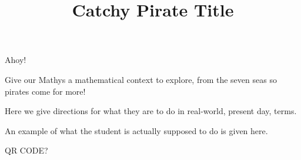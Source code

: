 \documentclass{../exhibit}
\title{Catchy Pirate Title}
\begin{document}
\begin{context}
  Ahoy!

  Give our Mathys a mathematical context to explore, from the seven
  seas  so pirates come for more!
\end{context}



\begin{directions}
  Here we give directions for what they are to do in real-world,
  present day, terms.
\end{directions}



\begin{example}
  An example of what the student is actually supposed to do is given
  here.
\end{example}



\begin{mathConnections}
  QR CODE?
\end{mathConnections}
\end{document}
